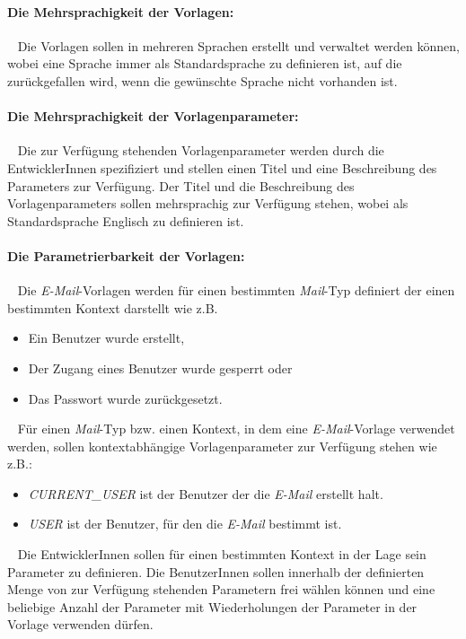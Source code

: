 \paragraph{Die Mehrsprachigkeit der Vorlagen:}
\ \newline
Die Vorlagen sollen in mehreren Sprachen erstellt und verwaltet werden können, wobei eine Sprache immer als Standardsprache zu definieren ist, auf die zurückgefallen wird, wenn die gewünschte Sprache nicht vorhanden ist.

\paragraph{Die Mehrsprachigkeit der Vorlagenparameter:}
\ \newline
Die zur Verfügung stehenden Vorlagenparameter werden durch die EntwicklerInnen spezifiziert und stellen einen Titel und eine Beschreibung des Parameters zur Verfügung. Der Titel und die Beschreibung des Vorlagenparameters  sollen mehrsprachig zur Verfügung stehen, wobei als Standardsprache Englisch zu definieren ist.

\paragraph{Die Parametrierbarkeit der Vorlagen:}
\ \newline
Die \emph{E-Mail}-Vorlagen werden für einen bestimmten \emph{Mail}-Typ definiert der einen bestimmten Kontext darstellt wie z.B.
\begin{itemize}
	\item Ein Benutzer wurde erstellt,
	\item Der Zugang eines Benutzer wurde gesperrt oder
	\item Das Passwort wurde zurückgesetzt.
\end{itemize}
\ \newline
Für einen \emph{Mail}-Typ bzw. einen Kontext, in dem eine \emph{E-Mail}-Vorlage verwendet werden, sollen kontextabhängige Vorlagenparameter zur Verfügung stehen wie z.B.:
\begin{itemize}
	\item\emph{CURRENT\_USER} ist der Benutzer der die \emph{E-Mail} erstellt halt.
	\item\emph{USER} ist der Benutzer, für den die \emph{E-Mail} bestimmt ist.
\end{itemize}
\ \newline
Die EntwicklerInnen sollen für einen bestimmten Kontext in der Lage sein Parameter zu definieren. Die BenutzerInnen sollen innerhalb der definierten Menge von zur Verfügung stehenden Parametern frei wählen können und eine beliebige Anzahl der Parameter mit Wiederholungen der Parameter in der Vorlage verwenden dürfen.
 
